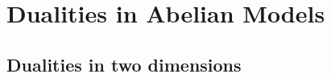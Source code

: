 \chapter{Dualities in Abelian Models}
\label{chap:dualities_in_abelian_models}














\section{Dualities in two dimensions}
\label{sec:dualities_in_two_dimensions}







